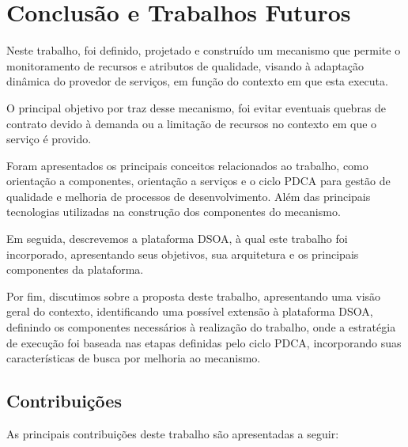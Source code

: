 \chapter{Conclusão e Trabalhos Futuros}
\label{ch:5}
Neste trabalho, foi definido, projetado e construído um mecanismo que permite o monitoramento de recursos e atributos de qualidade, visando à adaptação dinâmica do provedor de serviços, em função do contexto em que esta executa.

O principal objetivo por traz desse mecanismo, foi evitar eventuais quebras de contrato devido à demanda ou a limitação de recursos no contexto em que o serviço é provido.

Foram apresentados os principais conceitos relacionados ao trabalho, como orientação a componentes, orientação a serviços e o ciclo PDCA para gestão de qualidade e melhoria de processos de desenvolvimento. Além das principais tecnologias utilizadas na construção dos componentes do mecanismo.

Em seguida, descrevemos a plataforma DSOA, à qual este trabalho foi incorporado, apresentando seus objetivos, sua arquitetura e os principais componentes da plataforma. 

Por fim, discutimos sobre a proposta deste trabalho, apresentando uma visão geral do contexto, identificando uma possível extensão à plataforma DSOA, definindo os componentes necessários à realização do trabalho, onde a estratégia de execução foi baseada nas etapas definidas pelo ciclo PDCA, incorporando suas características de busca por melhoria ao mecanismo.

\section{Contribuições}

As principais contribuições deste trabalho são apresentadas a seguir:

